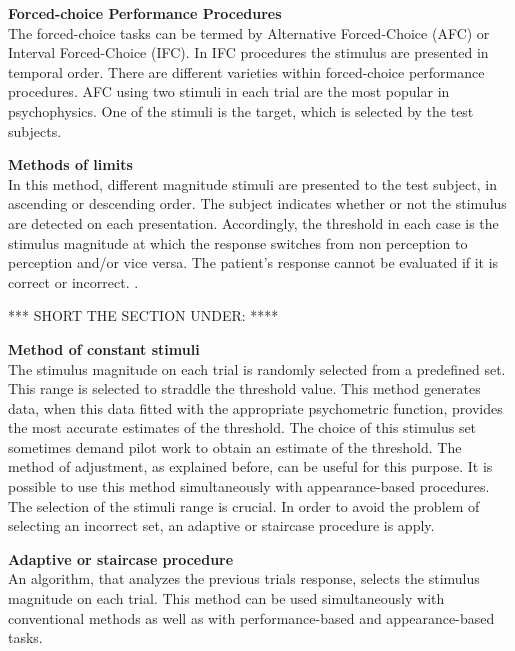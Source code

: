 \textbf{Forced-choice Performance Procedures}
\\
The forced-choice tasks can be termed by Alternative Forced-Choice (AFC) or Interval Forced-Choice (IFC). In IFC procedures the stimulus are presented in temporal order. There are different varieties within forced-choice performance procedures. AFC using two stimuli in each trial are the most popular in psychophysics. One of the stimuli is the target, which is selected by the test subjects.


\textbf{Methods of limits} 
\\
In this method, different magnitude stimuli are presented to the test subject, in ascending or descending order. The subject indicates whether or not the stimulus are detected on each presentation. Accordingly, the threshold in each case is the stimulus magnitude at which the response switches from non perception to perception and/or vice versa. The patient's response cannot be evaluated if it is correct or incorrect. \cite{Kingdom2016}.

*** SHORT THE SECTION UNDER: ****



\textbf{Method of constant stimuli}
\\
The stimulus magnitude on each trial is randomly selected from a predefined set. This range is selected to straddle the threshold value. This method generates data, when this data fitted with the appropriate psychometric function, provides the most accurate estimates of the threshold. The choice of this stimulus set sometimes demand pilot work to obtain an estimate of the threshold. The method of adjustment, as explained before, can be useful for this purpose. It is possible to use this method simultaneously with appearance-based procedures. The selection of the stimuli range is crucial. In order to avoid the problem of selecting an incorrect set, an adaptive or staircase procedure is apply.

\textbf{Adaptive or staircase procedure}
\\
An algorithm, that analyzes the previous trials response, selects the stimulus magnitude on each trial. This method can be used simultaneously  with conventional methods as well as with performance-based and appearance-based tasks.


